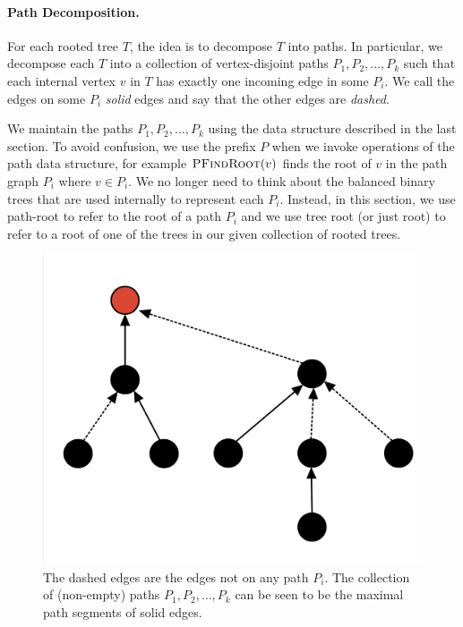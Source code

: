 \paragraph{Path Decomposition.} For each rooted tree $T$, the idea is to decompose $T$ into paths. In particular, we decompose each $T$ into a collection of vertex-disjoint paths $P_1, P_2, \dots, P_k$ such that each internal vertex $v$ in $T$ has exactly one incoming edge in some $P_i$. We call the edges on some $P_i$  \emph{solid} edges and say that the other edges are \emph{dashed}. 

We maintain the paths $P_1, P_2, \dots, P_k$ using the data structure described in the last section. To avoid confusion, we use the prefix $P$ when we invoke operations of the path data structure, for example $\textsc{PFindRoot}(v)$ finds the root of $v$ in the path graph $P_i$ where $v \in P_i$.
We no longer need to think about the balanced binary trees that are used internally to represent each $P_i$. Instead, in this section, we use path-root to refer to the root of a path $P_i$ and we use tree root (or just root) to refer to a root of one of the trees in our given collection of rooted trees.

\begin{figure}[!ht]
    \centering
    \includegraphics[scale=0.20]{./fig/HeavyLightDecomposition_lectureDynamicTree.jpeg}
    \caption{The dashed edges are the edges not on any path $P_i$. The collection of (non-empty) paths $P_1, P_2, \dots, P_k$ can be seen to be the maximal path segments of solid edges.}
\end{figure}

